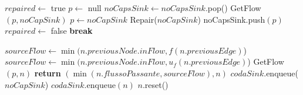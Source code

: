 \documentclass{article}
\begin{document}
\newpage

\begin{algorithm}
    \begin{algorithmic}[1]
        \STATE $repaired \leftarrow$ true
        \STATE $p \leftarrow $ null
        \STATE $noCapsSink \leftarrow noCapsSink.$pop()
        \STATE GetFlow$(p,noCapSink)$
        \STATE $p \leftarrow noCapSink$
        \STATE Repair($noCapSink$)
        \STATE noCapsSink.push$(p)$
        \STATE $repaired \leftarrow$ false
        \STATE \textbf{break}
        \ENDIF
        \ENDWHILE

         
        \STATE $sourceFlow \leftarrow \min(n.previousNode.inFlow,f(n.previousEdge)$)
        \ELSE
        \STATE $sourceFlow \leftarrow \min(n.previousNode.inFlow,u_f(n.previousEdge) $)
        \ENDIF
        \STATE GetFlow$(p,n)$
        \STATE \textbf{return} $(\min(n.flussoPassante,sourceFlow),n)$
        \ENDIF
        \ENDFOR
        \ENDIF
        \STATE $codaSink.$enqueue($noCapSink$)
        \ELSE
        \STATE $codaSink.$enqueue$(n)$
        \ENDFOR
        \STATE $n.$reset()
        \ENDFOR
        \ENDIF
        \ENDIF
        \ENDIF

    \end{algorithmic}
\end{algorithm}

\newpage
\end{document}
